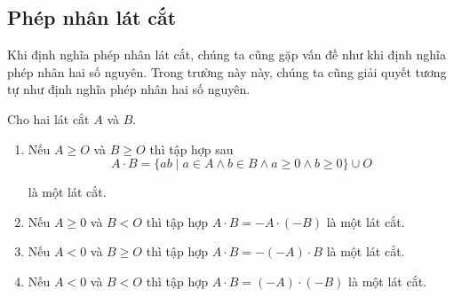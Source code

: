 \subsection{Phép nhân lát cắt}

Khi định nghĩa phép nhân lát cắt, chúng ta cũng gặp vấn đề như khi định nghĩa phép nhân hai số nguyên. Trong trường này này, chúng ta cũng giải quyết tương tự như định nghĩa phép nhân hai số nguyên.

\begin{theorem}
    Cho hai lát cắt $A$ và $B$.
    \begin{enumerate}[label={(\roman*)}]
        \item Nếu $A\geq O$ và $B\geq O$ thì tập hợp sau
              \[
                  A\cdot B = \{ ab \mid a\in A\wedge b\in B\wedge a\geq 0\wedge b\geq 0 \} \cup O
              \]

              là một lát cắt.
        \item Nếu $A\geq 0$ và $B < O$ thì tập hợp $A\cdot B = -A\cdot (-B)$ là một lát cắt.
        \item Nếu $A < 0$ và $B\geq O$ thì tập hợp $A\cdot B = -(-A)\cdot B$ là một lát cắt.
        \item Nếu $A < 0$ và $B < O$ thì tập hợp $A\cdot B = (-A)\cdot (-B)$ là một lát cắt.
    \end{enumerate}
\end{theorem}

